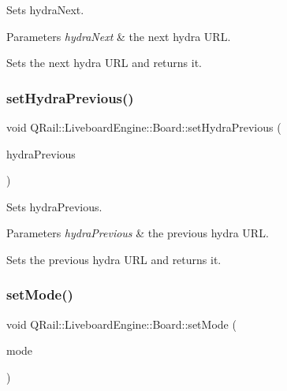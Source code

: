 Sets hydra\+Next. 


\begin{DoxyParams}{Parameters}
{\em hydra\+Next} & the next hydra U\+RL.\\
\hline
\end{DoxyParams}
Sets the next hydra U\+RL and returns it. \mbox{\label{classQRail_1_1LiveboardEngine_1_1Board_af8c481758c476c1e3bf471e87ba31613}} 
\subsubsection{\texorpdfstring{setHydraPrevious()}{setHydraPrevious()}}
{\footnotesize\ttfamily void Q\+Rail\+::\+Liveboard\+Engine\+::\+Board\+::set\+Hydra\+Previous (\begin{DoxyParamCaption}\item[{const Q\+Url \&}]{hydra\+Previous }\end{DoxyParamCaption})}



Sets hydra\+Previous. 


\begin{DoxyParams}{Parameters}
{\em hydra\+Previous} & the previous hydra U\+RL.\\
\hline
\end{DoxyParams}
Sets the previous hydra U\+RL and returns it. \mbox{\label{classQRail_1_1LiveboardEngine_1_1Board_a64e85afaca570209ba08a350460315d2}} 
\subsubsection{\texorpdfstring{setMode()}{setMode()}}
{\footnotesize\ttfamily void Q\+Rail\+::\+Liveboard\+Engine\+::\+Board\+::set\+Mode (\begin{DoxyParamCaption}\item[{const \mbox{\hyperlink{classQRail_1_1LiveboardEngine_1_1Board_a0ab6d318f405895f62c6e98cb2d86c6e}{Q\+Rail\+::\+Liveboard\+Engine\+::\+Board\+::\+Mode}} \&}]{mode }\end{DoxyParamCaption})}



